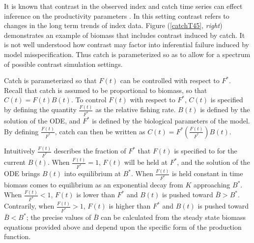 
%
It is known that contrast in the observed index and catch time series %
can effect inference on the productivity parameters \cite{hilborn_quantitative_1992}. %
In this setting contrast refers to changes in the long term trends of index data.
Figure (\ref{catchT45}, \emph{right}) demonstrates an example of biomass that
includes contrast induced by catch. It is not well understood how contrast may
factor into inferential failure induced by model misspecification. Thus catch
is parameterized so as to allow for a spectrum of possible contrast simulation settings.

%
Catch is parameterized so that $F(t)$ can be controlled with respect to $F^*$.
Recall that catch is assumed to be proportional to biomass, so that $C(t)=F(t)B(t)$.
To control $F(t)$ with respect to $F^*$, $C(t)$ is specified by defining the
quantity $\frac{F(t)}{F^*}$ as the relative fishing rate. $B(t)$ is defined
by the solution of the ODE, and $F^*$ is defined by the biological parameters
of the model. By defining $\frac{F(t)}{F^*}$, catch can then be written as
\mbox{$C(t)=F^*\left(\frac{F(t)}{F^*}\right)B(t)$.}

%
Intuitively $\frac{F(t)}{F^*}$ describes the fraction of $F^*$ that $F(t)$ is
specified to for the current $B(t)$. When $\frac{F(t)}{F^*}=1$, $F(t)$ will be
held at $F^*$, and the solution of the ODE brings $B(t)$ into equilibrium at
$B^*$. When $\frac{F(t)}{F^*}$ is held constant in time biomass %
comes to equilibrium as an exponential decay from $K$ approaching $B^*$.
When $\frac{F(t)}{F^*}<1$, $F(t)$ is lower than $F^*$ and $B(t)$ is pushed
toward $\bar B>B^*$. Contrarily, when $\frac{F(t)}{F^*}>1$, $F(t)$ is higher
than $F^*$ and $B(t)$ is pushed toward $\bar B<B^*$; the precise values of
$\bar B$ can be calculated from the steady state biomass equations provided
above and depend upon the specific form of the production function. %


